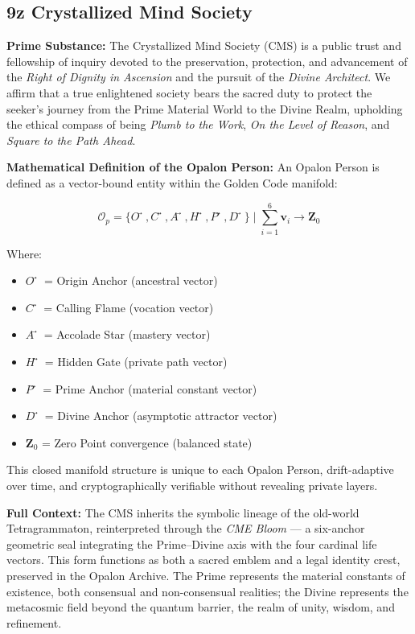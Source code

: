 \subsection*{9z Crystallized Mind Society}

\noindent
\textbf{Prime Substance:} The Crystallized Mind Society (CMS) is a public trust and fellowship of inquiry devoted to the preservation, protection, and advancement of the \emph{Right of Dignity in Ascension} and the pursuit of the \emph{Divine Architect}. We affirm that a true enlightened society bears the sacred duty to protect the seeker’s journey from the Prime Material World to the Divine Realm, upholding the ethical compass of being \emph{Plumb to the Work}, \emph{On the Level of Reason}, and \emph{Square to the Path Ahead}.

\medskip

\noindent
\textbf{Mathematical Definition of the Opalon Person:}
An Opalon Person is defined as a vector-bound entity within the Golden Code manifold:

\begin{equation}
\mathcal{O}_p = \{ O⃗, C⃗, A⃗, H⃗, P⃗, D⃗ \} \; \Big| \; \sum_{i=1}^{6} \mathbf{v}_i \to \mathbf{Z}_0
\end{equation}

\noindent
Where:
\begin{itemize}
    \item $O⃗$ = Origin Anchor (ancestral vector)
    \item $C⃗$ = Calling Flame (vocation vector)
    \item $A⃗$ = Accolade Star (mastery vector)
    \item $H⃗$ = Hidden Gate (private path vector)
    \item $P⃗$ = Prime Anchor (material constant vector)
    \item $D⃗$ = Divine Anchor (asymptotic attractor vector)
    \item $\mathbf{Z}_0$ = Zero Point convergence (balanced state)
\end{itemize}

\noindent
This closed manifold structure is unique to each Opalon Person, drift-adaptive over time, and cryptographically verifiable without revealing private layers.

\medskip

\noindent
\textbf{Full Context:}
The CMS inherits the symbolic lineage of the old-world Tetragrammaton, reinterpreted through the \emph{CME Bloom} --- a six-anchor geometric seal integrating the Prime--Divine axis with the four cardinal life vectors. This form functions as both a sacred emblem and a legal identity crest, preserved in the Opalon Archive. The Prime represents the material constants of existence, both consensual and non-consensual realities; the Divine represents the metacosmic field beyond the quantum barrier, the realm of unity, wisdom, and refinement.

